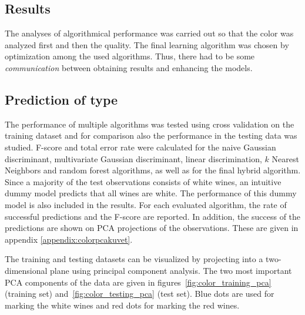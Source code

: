 \documentclass[twoside]{article}
\begin{document}
\begin{multicols}{2}


\section{Results}

The analyses of algorithmical performance was carried out so that the color was analyzed first and then the quality. The final learning algorithm
was chosen by optimization among the used algorithms. Thus, there had to be some \emph{communication} between obtaining results and enhancing the models.

\subsection{Prediction of type}

The performance of multiple algorithms was tested using cross validation on the training dataset and for comparison also the performance in the testing data was studied.
F-score and total error rate were calculated for the naive Gaussian discriminant, multivariate Gaussian discriminant, linear discrimination, $k$ Nearest Neighbors and random forest
algorithms, as well as for the final hybrid algorithm.
Since a majority of the test observations consists of white wines, an intuitive dummy model predicts that all wines are white. The performance of this dummy model
is also included in the results.
For each evaluated algorithm, the rate of successful predictions and the F-score are reported. In addition, the success of the predictions are shown on PCA projections
of the observations. These are given in appendix \ref{appendix:colorpcakuvet}.

The training and testing datasets can be visualized by projecting into a two-dimensional plane using principal component analysis. The two most important
PCA components of the data are given in figures~\ref{fig:color_training_pca} (training set) and~\ref{fig:color_testing_pca} (test set). 
Blue dots are used for marking the white wines and red dots for marking the red wines.


\end{multicols}
\end{document}
